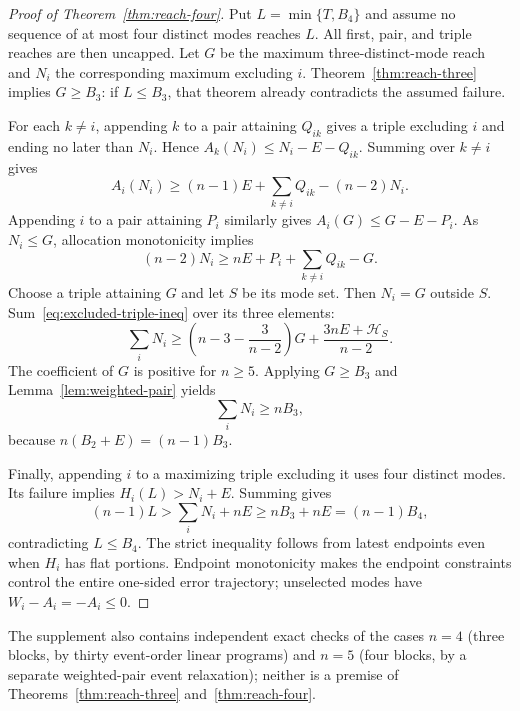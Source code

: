 \begin{proof}[Proof of Theorem~\ref{thm:reach-four}]
Put $L=\min\{T,B_4\}$ and assume no sequence of at most four distinct
modes reaches $L$. All first, pair, and triple reaches are then uncapped.
Let $G$ be the maximum three-distinct-mode reach and $N_i$ the corresponding
maximum excluding $i$. Theorem~\ref{thm:reach-three} implies $G\ge B_3$:
if $L\le B_3$, that theorem already contradicts the assumed failure.

For each $k\ne i$, appending $k$ to a pair attaining $Q_{ik}$ gives
a triple excluding $i$ and ending no later than $N_i$. Hence
$A_k(N_i)\le N_i-E-Q_{ik}$. Summing over $k\ne i$ gives
\[
 A_i(N_i)\ge(n-1)E+\sum_{k\ne i}Q_{ik}-(n-2)N_i.
\]
Appending $i$ to a pair attaining $P_i$ similarly gives
$A_i(G)\le G-E-P_i$. As $N_i\le G$, allocation monotonicity implies
\begin{equation}\label{eq:excluded-triple-ineq}
 (n-2)N_i\ge nE+P_i+\sum_{k\ne i}Q_{ik}-G.
\end{equation}
Choose a triple attaining $G$ and let $S$ be its mode set. Then $N_i=G$
outside $S$. Sum~\eqref{eq:excluded-triple-ineq} over its three elements:
\[
 \sum_iN_i\ge\left(n-3-\frac3{n-2}\right)G
                  +\frac{3nE+\mathcal H_S}{n-2}.
\]
The coefficient of $G$ is positive for $n\ge5$. Applying
$G\ge B_3$ and Lemma~\ref{lem:weighted-pair} yields
\begin{equation}\label{eq:aggregate-triple}
 \sum_iN_i\ge nB_3,
\end{equation}
because $n(B_2+E)=(n-1)B_3$.

Finally, appending $i$ to a maximizing triple excluding it uses four
distinct modes. Its failure implies $H_i(L)>N_i+E$. Summing gives
\[
 (n-1)L>\sum_iN_i+nE\ge nB_3+nE=(n-1)B_4,
\]
contradicting $L\le B_4$. The strict inequality follows from latest
endpoints even when $H_i$ has flat portions. Endpoint monotonicity makes
the endpoint constraints control the entire one-sided error trajectory;
unselected modes have $W_i-A_i=-A_i\le0$.
\end{proof}

The supplement also contains independent exact checks of the cases $n=4$
(three blocks, by thirty event-order linear programs) and $n=5$ (four
blocks, by a separate weighted-pair event relaxation); neither is a premise
of Theorems~\ref{thm:reach-three} and~\ref{thm:reach-four}.
